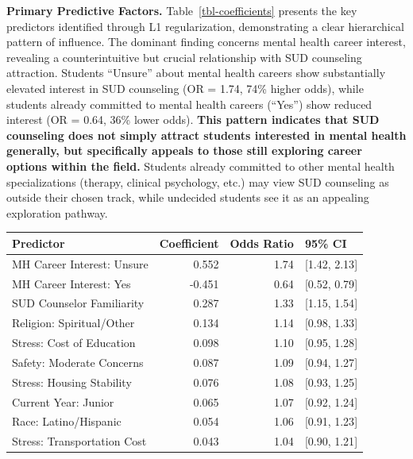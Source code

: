 \documentclass[
  man,
  longtable,
  nolmodern,
  notxfonts,
  notimes,
  colorlinks=true,linkcolor=blue,citecolor=blue,urlcolor=blue]{apa7}
\begin{document}
\textbf{Primary Predictive Factors.} Table~\ref{tbl-coefficients}
presents the key predictors identified through L1 regularization,
demonstrating a clear hierarchical pattern of influence. The dominant
finding concerns mental health career interest, revealing a
counterintuitive but crucial relationship with SUD counseling
attraction. Students ``Unsure'' about mental health careers show
substantially elevated interest in SUD counseling (OR = 1.74, 74\%
higher odds), while students already committed to mental health careers
(``Yes'') show reduced interest (OR = 0.64, 36\% lower odds).
\textbf{This pattern indicates that SUD counseling does not simply
attract students interested in mental health generally, but specifically
appeals to those still exploring career options within the field.}
Students already committed to other mental health specializations
(therapy, clinical psychology, etc.) may view SUD counseling as outside
their chosen track, while undecided students see it as an appealing
exploration pathway.

\begin{table}

{\caption{{Primary Predictors of SUD Counseling Career Interest from
L1-Regularized Logistic Regression}{\label{tbl-coefficients}}}
\vspace{-20pt}}

\begin{longtable}[]{@{}lrrl@{}}
\toprule\noalign{}
Predictor & Coefficient & Odds Ratio & 95\% CI \\
\midrule\noalign{}
\endhead
\bottomrule\noalign{}
\endlastfoot
MH Career Interest: Unsure & 0.552 & 1.74 & {[}1.42, 2.13{]} \\
MH Career Interest: Yes & -0.451 & 0.64 & {[}0.52, 0.79{]} \\
SUD Counselor Familiarity & 0.287 & 1.33 & {[}1.15, 1.54{]} \\
Religion: Spiritual/Other & 0.134 & 1.14 & {[}0.98, 1.33{]} \\
Stress: Cost of Education & 0.098 & 1.10 & {[}0.95, 1.28{]} \\
Safety: Moderate Concerns & 0.087 & 1.09 & {[}0.94, 1.27{]} \\
Stress: Housing Stability & 0.076 & 1.08 & {[}0.93, 1.25{]} \\
Current Year: Junior & 0.065 & 1.07 & {[}0.92, 1.24{]} \\
Race: Latino/Hispanic & 0.054 & 1.06 & {[}0.91, 1.23{]} \\
Stress: Transportation Cost & 0.043 & 1.04 & {[}0.90, 1.21{]} \\
\end{longtable}

\end{table}
\end{document}
